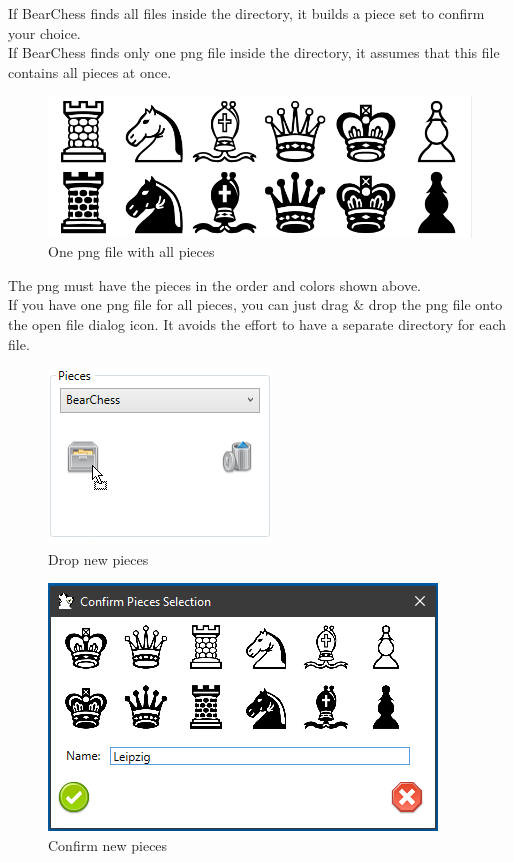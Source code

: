\documentclass[11pt,a4paper]{article}
\begin{document}
	If BearChess finds all files inside the directory, it builds a piece set to confirm your choice.\\
	
	If BearChess finds only one png file inside the directory, it assumes that this file contains all pieces at once.
	
	\begin{figure}[H]
		\centering
		\includegraphics[scale=6.5]{Leipzig.png}
		\caption{One png file with all pieces}
		\label{fig:Leipzig}
	\end{figure}
	
	The png must have the pieces in the order and colors shown above.\\
	If you have one png file for all pieces, you can just drag \& drop the png file onto the
	open file dialog icon. It avoids the effort to have a separate directory for each file.
	\begin{figure}[H]
		\centering
		\includegraphics[scale=0.9]{DropPieceSet.png}
		\caption{Drop new pieces }
		\label{fig:DropPieceSet}
	\end{figure}
	
	\begin{figure}[H]
		\centering
		\includegraphics[scale=0.9]{ConfirmPieces.png}
		\caption{Confirm new pieces }
		\label{fig:ConfirmPieces}
	\end{figure}
	
\end{document}
